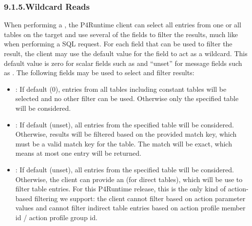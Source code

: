 \documentclass[11pt]{article}
\begin{document}
{%
\subsubsection{9.1.5.\hspace*{0.5em}Wildcard Reads}\label{sec-wildcard-reads}%

\noindent{}When performing a , the P4Runtime client can select all entries
from one or all tables on the target and use several of the  fields
to filter the results, much like when performing a SQL request. For each field
that can be used to filter the result, the client may use the default value for
the field to act as a wildcard. This default value is zero for scalar fields
such as  and \textquotedblleft{}unset\textquotedblright{} for message fields such as . The following
fields may be used to select and filter results:%

\begin{itemize}[noitemsep,topsep=\mdcompacttopsep]%

\item{}: If default (0), entries from all tables \textemdash{} including constant
tables \textemdash{} will be selected and no other filter can be used. Otherwise only
the specified table will be considered.%

\item{}: If default (unset), all entries from the specified table will be
considered. Otherwise, results will be filtered based on the provided match
key, which must be a valid match key for the table. The match will be exact,
which means at most one entry will be returned.%

\item{}: If default (unset), all entries from the specified table will be
considered. Otherwise, the client can provide an  (for direct
tables), which will be use to filter table entries. For this P4Runtime
release, this is the only kind of action-based filtering we support: the
client cannot filter based on action parameter values and cannot filter
indirect table entries based on action profile member id / action profile
group id.%


\end{itemize}}
\end{document}
